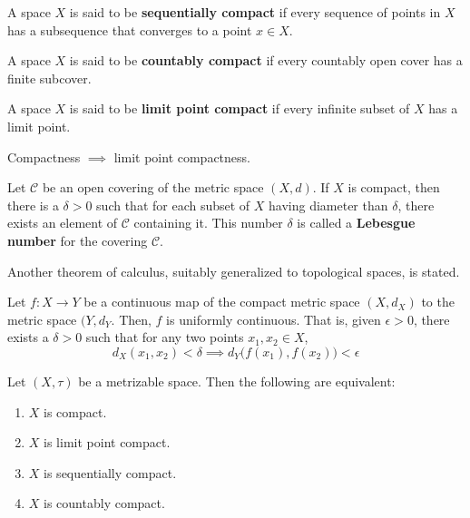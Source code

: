 \documentclass{article}
\begin{document}
    \begin{definition}
    A space $X$ is said to be \textbf{sequentially compact} if every sequence of points in $X$ has a subsequence that converges to a point $x \in X$. 
    \end{definition}

    \begin{definition}
    A space $X$ is said to be \textbf{countably compact} if every countably open cover has a finite subcover. 
    \end{definition}

    \begin{definition}
    A space $X$ is said to be \textbf{limit point compact} if every infinite subset of $X$ has a limit point. 
    \end{definition}

    \begin{theorem}
    Compactness $\implies$ limit point compactness.  
    \end{theorem}

    \begin{lemma}
    Let $\mathscr{C}$ be an open covering of the metric space $(X, d)$. If $X$ is compact, then there is a $\delta > 0$ such that for each subset of $X$ having diameter than $\delta$, there exists an element of $\mathscr{C}$ containing it. This number $\delta$ is called a \textbf{Lebesgue number} for the covering $\mathscr{C}$. 
    \end{lemma}

    Another theorem of calculus, suitably generalized to topological spaces, is stated. 
    \begin{theorem}
    Let $f: X \longrightarrow Y$ be a continuous map of the compact metric space $(X,d_X)$ to the metric space $(Y, d_Y$. Then, $f$ is uniformly continuous. That is, given $\epsilon > 0$, there exists a $\delta > 0$ such that for any two points $x_1, x_2 \in X$, 
    \[d_X (x_1, x_2) < \delta \implies d_Y \big( f(x_1), f(x_2)\big) < \epsilon\]
    \end{theorem}

    \begin{theorem}
    Let $(X, \tau)$ be a metrizable space. Then the following are equivalent: 
    \begin{enumerate}
        \item $X$ is compact. 
        \item $X$ is limit point compact. 
        \item $X$ is sequentially compact. 
        \item $X$ is countably compact. 
    \end{enumerate}
    \end{theorem}
\end{document}
